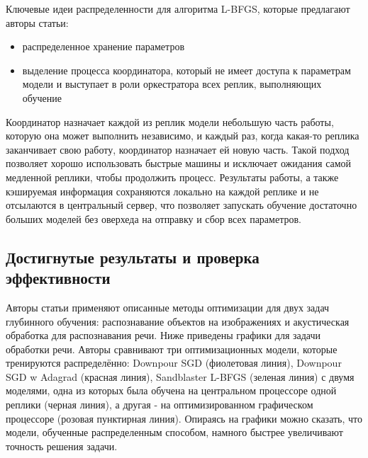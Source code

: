 Ключевые идеи распределенности для алгоритма L-BFGS, которые предлагают авторы статьи:
\begin{itemize}
  \item распределенное хранение параметров 
  \item выделение процесса координатора, который не имеет доступа к параметрам модели и выступает в роли оркестратора всех реплик, выполняющих обучение
\end{itemize}

Координатор назначает каждой из реплик модели небольшую часть работы, которую она может выполнить независимо, и каждый раз, когда какая-то реплика заканчивает свою работу, координатор назначает ей новую часть. Такой подход позволяет хорошо использовать быстрые машины и исключает ожидания самой медленной реплики, чтобы продолжить процесс. Результаты работы, а также кэшируемая информация сохраняются локально на каждой реплике и не отсылаются в центральный сервер, что позволяет запускать обучение достаточно больших моделей без оверхеда на отправку и сбор всех параметров. 


\subsection{Достигнутые результаты и проверка эффективности}


Авторы статьи применяют описанные методы оптимизации для двух задач глубинного обучения: распознавание объектов на изображениях и акустическая обработка для распознавания речи.
Ниже приведены графики для задачи обработки речи. Авторы сравнивают три оптимизационных модели, которые тренируются распределённо: Downpour SGD (фиолетовая линия), Downpour SGD w Adagrad (красная линия), Sandblaster L-BFGS (зеленая линия) с двумя моделями, одна из которых была обучена на центральном процессоре одной реплики (черная линия), а другая - на оптимизированном графическом процессоре (розовая пунктирная линия). Опираясь на графики можно сказать, что модели, обученные распределенным способом, намного быстрее увеличивают точность решения задачи. 

